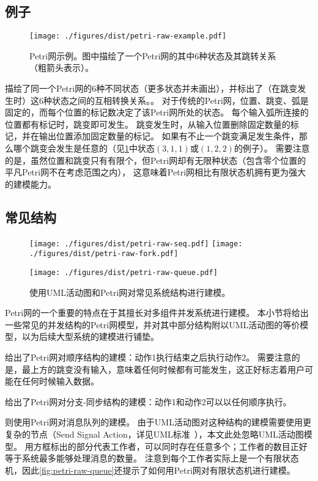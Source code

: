 \documentclass[index]{subfiles}
\begin{document}
\subsection{例子}
\begin{figure}[h]
  \centering
  \texttt{[image: ./figures/dist/petri-raw-example.pdf]}
  \caption[Petri网示例]{Petri网示例。图中描绘了一个Petri网的其中6种状态及其跳转关系（粗箭头表示）。\label{fig:petri-raw}}
\end{figure}
描绘了同一个Petri网的6种不同状态（更多状态并未画出），并标出了（在跳变发生时）这6种状态之间的互相转换关系。。
对于传统的Petri网，位置、跳变、弧是固定的，而每个位置的标记数决定了该Petri网所处的状态。
每个输入弧所连接的位置都有标记时，跳变即可发生。
跳变发生时，从输入位置删除固定数量的标记，并在输出位置添加固定数量的标记。
如果有不止一个跳变满足发生条件，那么哪个跳变会发生是任意的（见\cref{fig:petri-raw}中状态$(3,1,1)$或$(1,2,2)$的例子）。
需要注意的是，虽然位置和跳变只有有限个，但Petri网却有无限种状态（包含零个位置的平凡Petri网不在考虑范围之内），
这意味着Petri网相比有限状态机拥有更为强大的建模能力。

\subsection{常见结构}
\begin{figure}[h]
  \centering%
    {\texttt{[image: ./figures/dist/petri-raw-seq.pdf]}}
  \hspace{1em}
    {\texttt{[image: ./figures/dist/petri-raw-fork.pdf]}}\par
    {\texttt{[image: ./figures/dist/petri-raw-queue.pdf]}}
  \caption[常见系统结构的建模]{使用UML活动图和Petri网对常见系统结构进行建模。}
\end{figure}
Petri网的一个重要的特点在于其擅长对多组件并发系统进行建模。
本小节将给出一些常见的并发结构的Petri网模型，并对其中部分结构附以UML活动图的等价模型，以为后续大型系统的建模进行铺垫。

给出了Petri网对顺序结构的建模：动作1执行结束之后执行动作2。
需要注意的是，最上方的跳变没有输入，意味着任何时候都有可能发生，这正好标志着用户可能在任何时候输入数据。

给出了Petri网对分支-同步结构的建模：动作1和动作2可以以任何顺序执行。

则使用Petri网对消息队列的建模。
由于UML活动图对这种结构的建模需要使用更复杂的节点（Send Signal Action，详见UML标准~），本文此处忽略UML活动图模型。
用方框标出的部分代表工作者，可以同时存在任意多个；工作者的数目正好等于系统最多能够处理消息的数量。
注意到每个工作者实际上是一个有限状态机，因此\cref{fig:petri-raw-queue}还提示了如何用Petri网对有限状态机进行建模。
\end{document}
